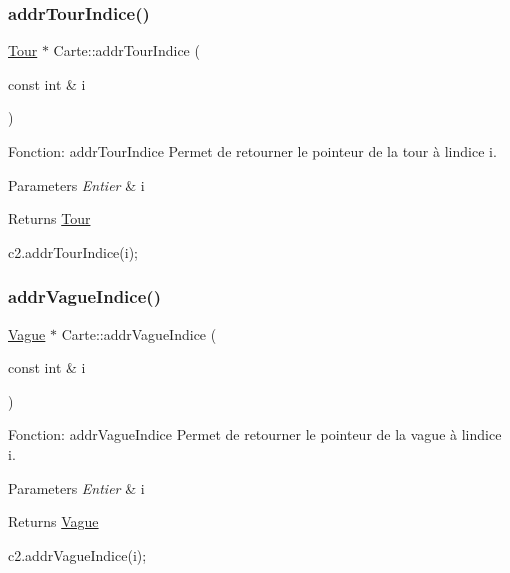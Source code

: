 \subsubsection{\texorpdfstring{addr\+Tour\+Indice()}{addrTourIndice()}}
{\footnotesize\ttfamily \hyperlink{classTour}{Tour} $\ast$ Carte\+::addr\+Tour\+Indice (\begin{DoxyParamCaption}\item[{const int \&}]{i }\end{DoxyParamCaption})}



Fonction\+: addr\+Tour\+Indice Permet de retourner le pointeur de la tour à l\textquotesingle{}indice i. 


\begin{DoxyParams}{Parameters}
{\em Entier} & i \\
\hline
\end{DoxyParams}
\begin{DoxyReturn}{Returns}
\hyperlink{classTour}{Tour} 
\begin{DoxyCode}
c2.addrTourIndice(i);
\end{DoxyCode}
 
\end{DoxyReturn}
\mbox{\label{classCarte_a21708cf932e4d0e74ed0222f7950582a}} 
\subsubsection{\texorpdfstring{addr\+Vague\+Indice()}{addrVagueIndice()}}
{\footnotesize\ttfamily \hyperlink{classVague}{Vague} $\ast$ Carte\+::addr\+Vague\+Indice (\begin{DoxyParamCaption}\item[{const int \&}]{i }\end{DoxyParamCaption})}



Fonction\+: addr\+Vague\+Indice Permet de retourner le pointeur de la vague à l\textquotesingle{}indice i. 


\begin{DoxyParams}{Parameters}
{\em Entier} & i \\
\hline
\end{DoxyParams}
\begin{DoxyReturn}{Returns}
\hyperlink{classVague}{Vague} 
\begin{DoxyCode}
c2.addrVagueIndice(i);
\end{DoxyCode}
 
\end{DoxyReturn}
\mbox{\label{classCarte_aef8696f9e6017496583bf32fb7cceb80}} 
